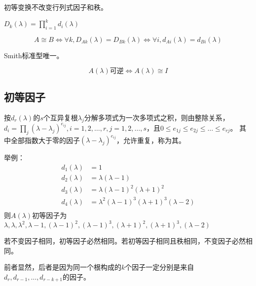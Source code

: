 \begin{theorem}
    初等变换不改变行列式因子和秩。
\end{theorem}

\begin{theorem}
    $D_k(\lambda)=\prod\limits_{i=1}^{k} d_i(\lambda)$
\end{theorem}

\begin{corollary}
    \[
        A\cong B
        \Leftrightarrow \forall k, D_{Ak}(\lambda) = D_{Bk}(\lambda)
        \Leftrightarrow \forall i, d_{Ai}(\lambda) = d_{Bi}(\lambda)
    \]
\end{corollary}

\begin{theorem}
    Smith标准型唯一。
\end{theorem}

\begin{theorem}
    \[
        A(\lambda)\text{可逆}\Leftrightarrow A(\lambda)\cong I
    \]
\end{theorem}

\subsection{初等因子}

\begin{definition}
    按$d_r(\lambda)$的$s$个互异复根$\lambda_j$分解多项式为一次多项式之积，则由整除关系，
    $d_i=\prod_j (\lambda-\lambda_j)^{e_{ij}},i=1,2,\dots,r,j=1,2,\dots,s$，且$0\leq e_{1j}\leq e_{2j} \leq\dots\leq e_{rj}$。
    其中全部指数大于零的因子$(\lambda-\lambda_j)^{e_{ij}}$，允许重复，称为其。
\end{definition}

举例：
\[
    \begin{aligned}
        d_{1}(\lambda) &= 1 \\
        d_{2}(\lambda) &= \lambda(\lambda-1) \\
        d_{3}(\lambda) &= \lambda(\lambda-1)^{2}(\lambda+1)^{2} \\
        d_{4}(\lambda) &= \lambda^{2}(\lambda-1)^{3}(\lambda+1)^{3}(\lambda-2) \\
    \end{aligned}
\]
则$A(\lambda)$初等因子为$\lambda, \lambda, \lambda^{2}, \lambda-1, (\lambda-1)^{2},(\lambda-1)^{3},(\lambda+1)^{2},(\lambda+1)^{3},(\lambda-2)$

\begin{property}
    若不变因子相同，初等因子必然相同。若初等因子相同且秩相同，不变因子必然相同。
\end{property}
前者显然，后者是因为同一个根构成的$k$个因子一定分别是来自$d_r,d_{r-1},\dots,d_{r-k+1}$的因子。

